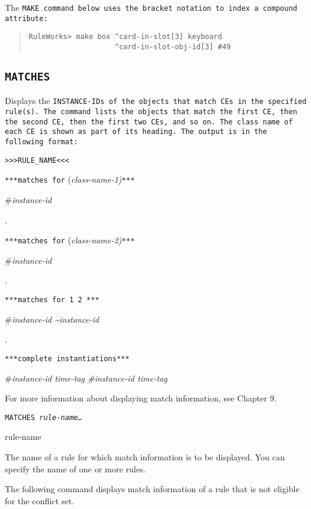 The \tt{MAKE} command below uses the bracket notation to index a
compound attribute:

\begin{quote}
\begin{verbatim}
RuleWorks> make box ^card-in-slot[3] keyboard 
                    ^card-in-slot-obj-id[3] #49
\end{verbatim}
\end{quote}

\subsection{\tt{MATCHES}}

Displays the \tt{INSTANCE-ID}s of the objects that match CEs in
the specified rule(s). The command lists the objects that
match the first CE, then the second CE, then the first two
CEs, and so on. The class name of each CE is shown as part of
its heading. The output is in the following format:

\verb|>>>RULE_NAME<<<|

\verb|***matches for| (\it{class-name-1})\verb|***|

\#\it{instance-id}

.

\verb|***matches for| (\it{class-name-2})\verb|***|

\#\it{instance-id}

.

\verb|***matches for 1 2 ***|

\#\it{instance-id} \textasciitilde\it{instance-id}

.

\verb|***complete instantiations***|

\#\it{instance-id} \it{time-tag} \#\it{instance-id} \it{time-tag}

For more information about displaying match information, see
Chapter 9.

\Format

\tt{MATCHES} \it{rule-name}\ldots

\begin{arguments}
\item[rule-name]

  The name of a rule for which match information is to be
  displayed. You can specify the name of one or more rules.
\end{arguments}

\Example

The following command displays match information of a rule that is not
eligible for the conflict set.

